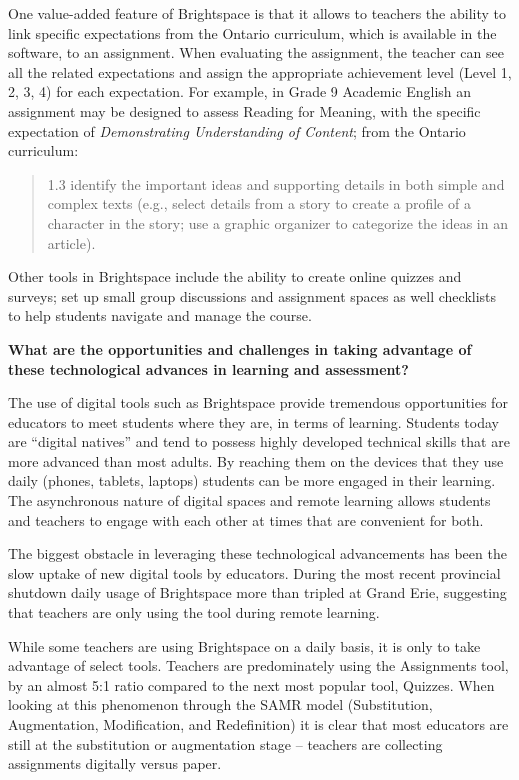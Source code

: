 \documentclass[
]{book}
\begin{document}
One value-added feature of Brightspace is that it allows to teachers the ability to link specific expectations from the Ontario curriculum, which is available in the software, to an assignment. When evaluating the assignment, the teacher can see all the related expectations and assign the appropriate achievement level (Level 1, 2, 3, 4) for each expectation. For example, in Grade 9 Academic English an assignment may be designed to assess Reading for Meaning, with the specific expectation of \emph{Demonstrating Understanding of Content}; from the Ontario curriculum:

\begin{quote}
1.3 identify the important ideas and supporting details in both simple and complex texts (e.g., select details from a story to create a profile of a character in the story; use a graphic organizer to categorize the ideas in an article).
\end{quote}

Other tools in Brightspace include the ability to create online quizzes and surveys; set up small group discussions and assignment spaces as well checklists to help students navigate and manage the course.

\textbf{What are the opportunities and challenges in taking advantage of these technological advances in learning and assessment?}

The use of digital tools such as Brightspace provide tremendous opportunities for educators to meet students where they are, in terms of learning. Students today are ``digital natives'' and tend to possess highly developed technical skills that are more advanced than most adults. By reaching them on the devices that they use daily (phones, tablets, laptops) students can be more engaged in their learning. The asynchronous nature of digital spaces and remote learning allows students and teachers to engage with each other at times that are convenient for both.

The biggest obstacle in leveraging these technological advancements has been the slow uptake of new digital tools by educators. During the most recent provincial shutdown daily usage of Brightspace more than tripled at Grand Erie, suggesting that teachers are only using the tool during remote learning.

While some teachers are using Brightspace on a daily basis, it is only to take advantage of select tools. Teachers are predominately using the Assignments tool, by an almost 5:1 ratio compared to the next most popular tool, Quizzes. When looking at this phenomenon through the SAMR model (Substitution, Augmentation, Modification, and Redefinition) it is clear that most educators are still at the substitution or augmentation stage -- teachers are collecting assignments digitally versus paper.
\end{document}
